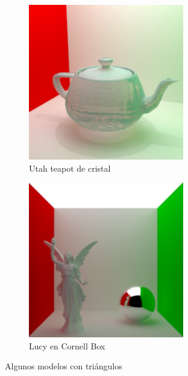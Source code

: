\documentclass{article}
\begin{document}
\begin{figure}[H]
\begin{subfigure}[h]{0.4\linewidth}
\includegraphics[width=\linewidth]{imgs/crystal_teapot.png}
\caption{Utah teapot de cristal}
\end{subfigure}
\hfill
\begin{subfigure}[h]{0.4\linewidth}
\includegraphics[width=\linewidth]{imgs/lucy.png}
\caption{Lucy en Cornell Box}
\end{subfigure}
\caption{Algunos modelos con triángulos}
\end{figure}
\end{document}
